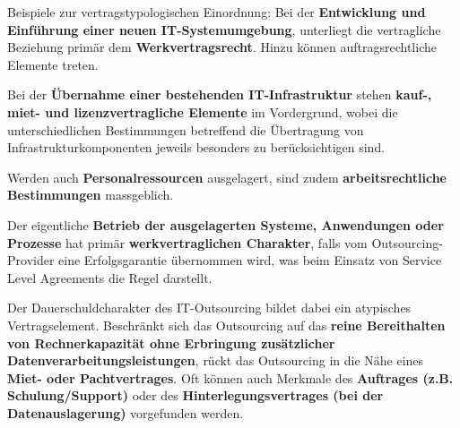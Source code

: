 Beispiele zur vertragstypologischen Einordnung:
Bei der \textbf{Entwicklung und Einführung einer neuen IT-Systemumgebung}, unterliegt die vertragliche Beziehung primär dem \textbf{Werkvertragsrecht}. Hinzu können auftragsrechtliche Elemente treten.

Bei der \textbf{Übernahme einer bestehenden IT-Infrastruktur} stehen \textbf{kauf-, miet- und lizenzvertragliche Elemente} im Vordergrund, wobei die unterschiedlichen Bestimmungen betreffend die Übertragung von Infrastrukturkomponenten jeweils besonders zu berücksichtigen sind.

Werden auch \textbf{Personalressourcen} ausgelagert, sind zudem \textbf{arbeitsrechtliche Bestimmungen} massgeblich.

Der eigentliche \textbf{Betrieb der ausgelagerten Systeme, Anwendungen oder Prozesse} hat primär \textbf{werkvertraglichen Charakter}, falls vom Outsourcing-Provider eine Erfolgsgarantie übernommen wird, was beim Einsatz von Service Level Agreements die Regel darstellt.

Der Dauerschuldcharakter des IT-Outsourcing bildet dabei ein atypisches Vertragselement. Beschränkt sich das Outsourcing auf das \textbf{reine Bereithalten von Rechnerkapazität ohne Erbringung zusätzlicher Datenverarbeitungsleistungen}, rückt das Outsourcing in die Nähe eines \textbf{Miet- oder Pachtvertrages}. Oft können auch Merkmale des \textbf{Auftrages (z.B. Schulung/Support)} oder des \textbf{Hinterlegungsvertrages (bei der Datenauslagerung)} vorgefunden werden.

